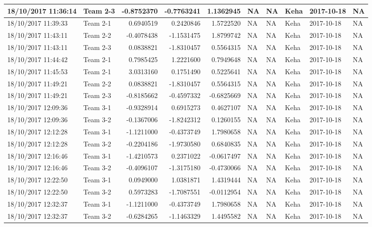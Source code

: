 \documentclass[]{article}
\begin{document}
\begin{tabular}{l|l|r|r|r|l|l|l|l|l}
\hline
18/10/2017 11:36:14 & Team 2-3 & -0.8752370 & -0.7763241 & 1.1362945 & NA & NA & Keha & 2017-10-18 & NA\\
\hline
18/10/2017 11:39:33 & Team 2-1 & 0.6940519 & 0.2420846 & 1.5722520 & NA & NA & Keha & 2017-10-18 & NA\\
\hline
18/10/2017 11:43:11 & Team 2-2 & -0.4078438 & -1.1531475 & 1.8799742 & NA & NA & Keha & 2017-10-18 & NA\\
\hline
18/10/2017 11:43:11 & Team 2-3 & 0.0838821 & -1.8310457 & 0.5564315 & NA & NA & Keha & 2017-10-18 & NA\\
\hline
18/10/2017 11:44:42 & Team 2-1 & 0.7985425 & 1.2221600 & 0.7949648 & NA & NA & Keha & 2017-10-18 & NA\\
\hline
18/10/2017 11:45:53 & Team 2-1 & 3.0313160 & 0.1751490 & 0.5225641 & NA & NA & Keha & 2017-10-18 & NA\\
\hline
18/10/2017 11:49:21 & Team 2-2 & 0.0838821 & -1.8310457 & 0.5564315 & NA & NA & Keha & 2017-10-18 & NA\\
\hline
18/10/2017 11:49:21 & Team 2-3 & -0.8185662 & -0.4597332 & -0.6825669 & NA & NA & Keha & 2017-10-18 & NA\\
\hline
18/10/2017 12:09:36 & Team 3-1 & -0.9328914 & 0.6915273 & 0.4627107 & NA & NA & Keha & 2017-10-18 & NA\\
\hline
18/10/2017 12:09:36 & Team 3-2 & -0.1367006 & -1.8242312 & 0.1260155 & NA & NA & Keha & 2017-10-18 & NA\\
\hline
18/10/2017 12:12:28 & Team 3-1 & -1.1211000 & -0.4373749 & 1.7980658 & NA & NA & Keha & 2017-10-18 & NA\\
\hline
18/10/2017 12:12:28 & Team 3-2 & -0.2204186 & -1.9730580 & 0.6840835 & NA & NA & Keha & 2017-10-18 & NA\\
\hline
18/10/2017 12:16:46 & Team 3-1 & -1.4210573 & 0.2371022 & -0.0617497 & NA & NA & Keha & 2017-10-18 & NA\\
\hline
18/10/2017 12:16:46 & Team 3-2 & -0.4096107 & -1.3175180 & -0.4730066 & NA & NA & Keha & 2017-10-18 & NA\\
\hline
18/10/2017 12:22:50 & Team 3-1 & 0.0949000 & 1.0381871 & 1.4319444 & NA & NA & Keha & 2017-10-18 & NA\\
\hline
18/10/2017 12:22:50 & Team 3-2 & 0.5973283 & -1.7087551 & -0.0112954 & NA & NA & Keha & 2017-10-18 & NA\\
\hline
18/10/2017 12:32:37 & Team 3-1 & -1.1211000 & -0.4373749 & 1.7980658 & NA & NA & Keha & 2017-10-18 & NA\\
\hline
18/10/2017 12:32:37 & Team 3-2 & -0.6284265 & -1.1463329 & 1.4495582 & NA & NA & Keha & 2017-10-18 & NA\\

\end{tabular}
\end{document}

